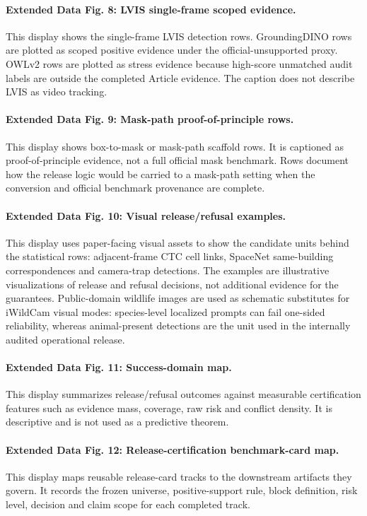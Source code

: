 \documentclass[11pt]{article}
\begin{document}
\paragraph{Extended Data Fig. 8: LVIS single-frame scoped evidence.}
This display shows the single-frame LVIS detection rows.
GroundingDINO rows are plotted as scoped positive evidence under the official-unsupported proxy.
OWLv2 rows are plotted as stress evidence because high-score unmatched audit labels are outside the completed Article evidence.
The caption does not describe LVIS as video tracking.

\paragraph{Extended Data Fig. 9: Mask-path proof-of-principle rows.}
This display shows box-to-mask or mask-path scaffold rows.
It is captioned as proof-of-principle evidence, not a full official mask benchmark.
Rows document how the release logic would be carried to a mask-path setting when the conversion and official benchmark provenance are complete.

\paragraph{Extended Data Fig. 10: Visual release/refusal examples.}
This display uses paper-facing visual assets to show the candidate units behind the statistical rows: adjacent-frame CTC cell links, SpaceNet same-building correspondences and camera-trap detections.
The examples are illustrative visualizations of release and refusal decisions, not additional evidence for the guarantees.
Public-domain wildlife images are used as schematic substitutes for iWildCam visual modes: species-level localized prompts can fail one-sided reliability, whereas animal-present detections are the unit used in the internally audited operational release.

\paragraph{Extended Data Fig. 11: Success-domain map.}
This display summarizes release/refusal outcomes against measurable certification features such as evidence mass, coverage, raw risk and conflict density.
It is descriptive and is not used as a predictive theorem.

\paragraph{Extended Data Fig. 12: Release-certification benchmark-card map.}
This display maps reusable release-card tracks to the downstream artifacts they govern.
It records the frozen universe, positive-support rule, block definition, risk level, decision and claim scope for each completed track.
\end{document}
